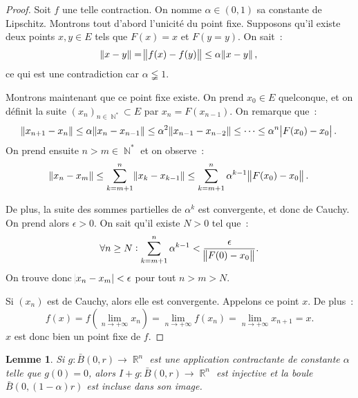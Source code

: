 \documentclass{article}
\DeclareMathOperator{\N}{\mathbb N}
\DeclareMathOperator{\R}{\mathbb R}
\newtheorem{lem}[thm]{Lemme}
\theoremstyle{definition}
\theoremstyle{remark}
\begin{document}
		\begin{proof} Soit $f$ une telle contraction. On nomme $\alpha \in (0, 1)$ sa constante de Lipschitz. Montrons tout d'abord l'unicité du point fixe.
		Supposons qu'il existe deux points $x, y \in E$ tels que $F(x) = x$ et $F(y = y)$. On sait~:
		\[\norm {x-y} = \norm{f(x)-f(y)} \leq \alpha\norm{x-y},\]
		ce qui est une contradiction car $\alpha \lneqq 1$.

		Montrons maintenant que ce point fixe existe. On prend $x_0 \in E$ quelconque, et on définit la suite $(x_n)_{n \in \N^*} \subset E$ par
		$x_n = F(x_{n-1})$. On remarque que~:
		\[\norm{x_{n+1} - x_n} \leq \alpha\norm{x_n-x_{n-1}} \leq \alpha^2\norm{x_{n-1}-x_{n-2}} \leq \dotsb \leq \alpha^n\abs{F(x_0)-x_0}.\]
		On prend ensuite $n > m \in \N^*$ et on observe~:
		\[\norm{x_n-x_m} \leq \sum_{k=m+1}^n\norm{x_k-x_{k-1}} \leq \sum_{k=m+1}^n\alpha^{k-1}\norm{F(x_0)-x_0}.\]

		De plus, la suite des sommes partielles de $\alpha^k$ est convergente, et donc de Cauchy. On prend alors $\epsilon > 0$. On sait qu'il existe $N > 0$
		tel que~:
		\[\forall n \geq N : \sum_{k=m+1}^n\alpha^{k-1} < \frac \epsilon{\norm{F(0)-x_0}}.\]
		On trouve donc $\abs {x_n - x_m} < \epsilon$ pour tout $n > m > N$.

		Si $(x_n)$ est de Cauchy, alors elle est convergente. Appelons ce point $x$. De plus~:
		\[f(x) = f(\lim_{n \to +\infty}x_n) = \lim_{n \to +\infty}f(x_n) = \lim_{n \to + \infty}x_{n+1} = x.\]
		$x$ est donc bien un point fixe de $f$.
		\end{proof}

		\begin{lem}\label{lem:contractanteinjective} Si $g : \bar B(0, r) \to \R^n$ est une application contractante de constante $\alpha$ telle que $g(0)=0$,
		alors $I+g : \bar B(0, r) \to \R^n$ est injective et la boule $\bar B(0, (1-\alpha)r)$ est incluse dans son image.
		\end{lem}
\end{document}
